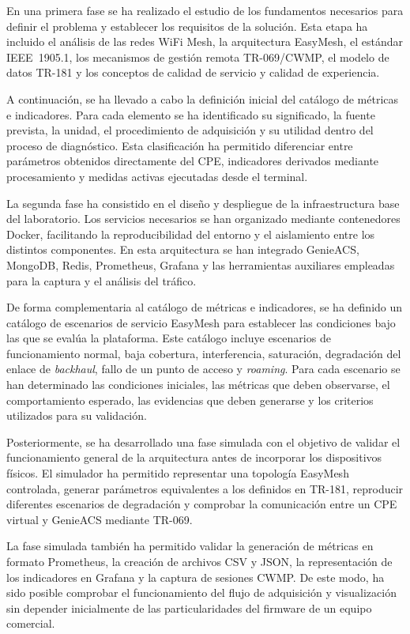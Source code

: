 En una primera fase se ha realizado el estudio de los fundamentos
necesarios para definir el problema y establecer los requisitos de la
solución. Esta etapa ha incluido el análisis de las redes WiFi Mesh, la
arquitectura EasyMesh, el estándar IEEE~1905.1, los mecanismos de gestión
remota TR-069/CWMP, el modelo de datos TR-181 y los conceptos de calidad
de servicio y calidad de experiencia.

A continuación, se ha llevado a cabo la definición inicial del catálogo
de métricas e indicadores. Para cada elemento se ha identificado su
significado, la fuente prevista, la unidad, el procedimiento de
adquisición y su utilidad dentro del proceso de diagnóstico. Esta
clasificación ha permitido diferenciar entre parámetros obtenidos
directamente del CPE, indicadores derivados mediante procesamiento y
medidas activas ejecutadas desde el terminal.

La segunda fase ha consistido en el diseño y despliegue de la
infraestructura base del laboratorio. Los servicios necesarios se han
organizado mediante contenedores Docker, facilitando la reproducibilidad
del entorno y el aislamiento entre los distintos componentes. En esta
arquitectura se han integrado GenieACS, MongoDB, Redis, Prometheus,
Grafana y las herramientas auxiliares empleadas para la captura y el
análisis del tráfico.

De forma complementaria al catálogo de métricas e indicadores, se ha
definido un catálogo de escenarios de servicio EasyMesh para establecer
las condiciones bajo las que se evalúa la plataforma. Este catálogo
incluye escenarios de funcionamiento normal, baja cobertura,
interferencia, saturación, degradación del enlace de
\textit{backhaul}, fallo de un punto de acceso y
\textit{roaming}. Para cada escenario se han determinado las condiciones
iniciales, las métricas que deben observarse, el comportamiento esperado,
las evidencias que deben generarse y los criterios utilizados para su
validación.

Posteriormente, se ha desarrollado una fase simulada con el objetivo de
validar el funcionamiento general de la arquitectura antes de incorporar
los dispositivos físicos. El simulador ha permitido representar una
topología EasyMesh controlada, generar parámetros equivalentes a los
definidos en TR-181, reproducir diferentes escenarios de degradación y
comprobar la comunicación entre un CPE virtual y GenieACS mediante
TR-069.

La fase simulada también ha permitido validar la generación de métricas
en formato Prometheus, la creación de archivos CSV y JSON, la
representación de los indicadores en Grafana y la captura de sesiones
CWMP. De este modo, ha sido posible comprobar el funcionamiento del flujo
de adquisición y visualización sin depender inicialmente de las
particularidades del firmware de un equipo comercial.

